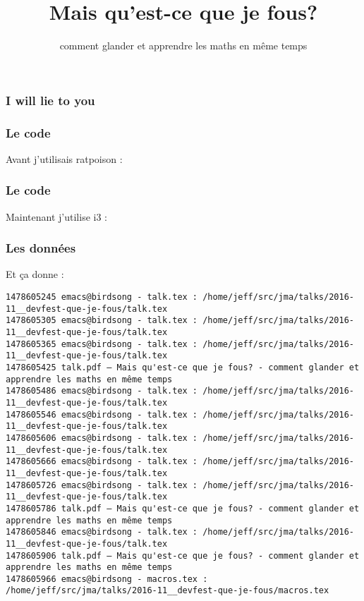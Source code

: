 
\usepackage{centernot}
\usepackage[]{algorithm2e}

\title
{Mais qu'est-ce que je fous?}
\subtitle{comment glander et apprendre les maths en même temps}


\Large

\begin{frame}
  \titlepage
\end{frame}


\begin{frame}
  \frametitle{I will lie to you}
\end{frame}

\begin{frame}
\end{frame}

\begin{frame}
  \frametitle{Le code}
  Avant j'utilisais ratpoison :
  \vspace{1cm}
  
\end{frame}

\begin{frame}
  \frametitle{Le code}
  Maintenant j'utilise i3 :
  \vspace{1cm}
  
\end{frame}

\begin{frame}[fragile]
  \frametitle{Les données}
  Et ça donne :
  \vspace{1cm}
  \begin{Verbatim}[fontsize=\tiny]
1478605245 emacs@birdsong - talk.tex : /home/jeff/src/jma/talks/2016-11__devfest-que-je-fous/talk.tex
1478605305 emacs@birdsong - talk.tex : /home/jeff/src/jma/talks/2016-11__devfest-que-je-fous/talk.tex
1478605365 emacs@birdsong - talk.tex : /home/jeff/src/jma/talks/2016-11__devfest-que-je-fous/talk.tex
1478605425 talk.pdf — Mais qu'est-ce que je fous? - comment glander et apprendre les maths en même temps
1478605486 emacs@birdsong - talk.tex : /home/jeff/src/jma/talks/2016-11__devfest-que-je-fous/talk.tex
1478605546 emacs@birdsong - talk.tex : /home/jeff/src/jma/talks/2016-11__devfest-que-je-fous/talk.tex
1478605606 emacs@birdsong - talk.tex : /home/jeff/src/jma/talks/2016-11__devfest-que-je-fous/talk.tex
1478605666 emacs@birdsong - talk.tex : /home/jeff/src/jma/talks/2016-11__devfest-que-je-fous/talk.tex
1478605726 emacs@birdsong - talk.tex : /home/jeff/src/jma/talks/2016-11__devfest-que-je-fous/talk.tex
1478605786 talk.pdf — Mais qu'est-ce que je fous? - comment glander et apprendre les maths en même temps
1478605846 emacs@birdsong - talk.tex : /home/jeff/src/jma/talks/2016-11__devfest-que-je-fous/talk.tex
1478605906 talk.pdf — Mais qu'est-ce que je fous? - comment glander et apprendre les maths en même temps
1478605966 emacs@birdsong - macros.tex : /home/jeff/src/jma/talks/2016-11__devfest-que-je-fous/macros.tex
  \end{Verbatim}
\end{frame}

